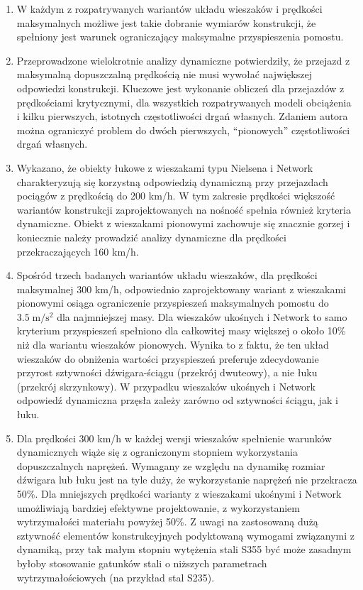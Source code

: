 \begin{enumerate}
	
\item W każdym z rozpatrywanych wariantów układu wieszaków i prędkości maksymalnych możliwe jest takie dobranie wymiarów konstrukcji, że spełniony jest warunek ograniczający maksymalne przyspieszenia pomostu.

\item Przeprowadzone wielokrotnie analizy dynamiczne potwierdziły, że przejazd z maksymalną dopuszczalną prędkością nie musi wywołać największej odpowiedzi konstrukcji. Kluczowe jest wykonanie obliczeń dla przejazdów z prędkościami krytycznymi, dla wszystkich rozpatrywanych modeli obciążenia i kilku pierwszych, istotnych częstotliwości drgań własnych. Zdaniem autora można ograniczyć problem do dwóch pierwszych, \enquote{pionowych} częstotliwości drgań własnych.
	
\item Wykazano, że obiekty łukowe z wieszakami typu Nielsena i Network charakteryzują się korzystną odpowiedzią dynamiczną przy przejazdach pociągów z prędkością do 200 km/h. W tym zakresie prędkości większość wariantów konstrukcji zaprojektowanych na nośność spełnia również kryteria dynamiczne. Obiekt z wieszakami pionowymi zachowuje się znacznie gorzej i koniecznie należy prowadzić analizy dynamiczne dla prędkości przekraczających 160 km/h. 

\item Spośród trzech badanych wariantów układu wieszaków, dla prędkości maksymalnej 300 km/h, odpowiednio zaprojektowany wariant z wieszakami pionowymi osiąga ograniczenie przyspieszeń maksymalnych pomostu do $3.5\;\mathrm{m/s^2}$ dla najmniejszej masy. Dla wieszaków ukośnych i Network to samo kryterium przyspieszeń spełniono dla całkowitej masy większej o około 10\% niż dla wariantu wieszaków pionowych. Wynika to z faktu, że ten układ wieszaków do obniżenia wartości przyspieszeń preferuje zdecydowanie przyrost sztywności dźwigara-ściągu (przekrój dwuteowy), a nie łuku (przekrój skrzynkowy). W przypadku wieszaków ukośnych i Network odpowiedź dynamiczna przęsła zależy zarówno od sztywności ściągu, jak i łuku.

\item Dla prędkości 300 km/h w każdej wersji wieszaków spełnienie warunków dynamicznych wiąże się z ograniczonym stopniem wykorzystania dopuszczalnych naprężeń. Wymagany ze względu na dynamikę rozmiar dźwigara lub łuku jest na tyle duży, że wykorzystanie naprężeń nie przekracza 50\%. Dla mniejszych prędkości warianty z wieszakami ukośnymi i Network umożliwiają bardziej efektywne projektowanie, z wykorzystaniem wytrzymałości materiału powyżej 50\%. Z uwagi na zastosowaną dużą sztywność elementów konstrukcyjnych podyktowaną wymogami związanymi z dynamiką, przy tak małym stopniu wytężenia stali S355 być może zasadnym byłoby stosowanie gatunków stali o niższych parametrach wytrzymałościowych (na przykład stal S235).


\end{enumerate}

